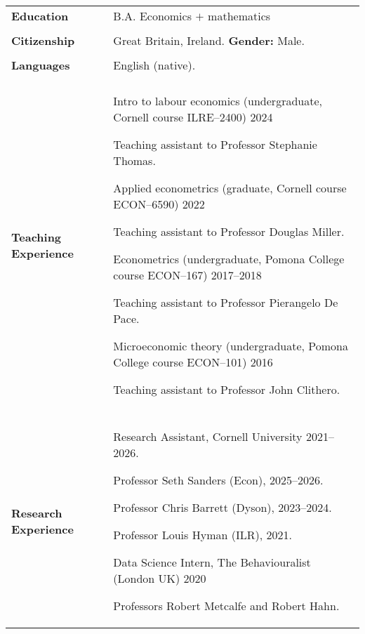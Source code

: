 \documentclass[letterpaper,11pt,oneside]{article}
\begin{document}
\begin{longtable}[\textwidth]{p{} p{}}
\textbf{Education}
    & B.A. Economics $+$ mathematics  \\ \\

\textbf{Citizenship}
    & Great Britain, Ireland. \hfill \textbf{Gender:} Male. \\ \\

\textbf{Languages}
    & English (native). \\ \\
        
\textbf{Teaching Experience}
    & Intro to labour economics (undergraduate, Cornell course ILRE--2400) \hfill 2024

    \indent\hspace{1cm} Teaching assistant to Professor Stephanie Thomas.

    Applied econometrics (graduate, Cornell course ECON--6590) \hfill 2022 
    
    \indent\hspace{1cm} Teaching assistant to Professor Douglas Miller.
    
    Econometrics (undergraduate, Pomona College course ECON--167) \hfill 2017--2018
    
    \indent\hspace{1cm} Teaching assistant to Professor Pierangelo De Pace.

    Microeconomic theory (undergraduate, Pomona College course ECON--101) \hfill 2016

    \indent\hspace{1cm} Teaching assistant to Professor John Clithero. \\ \\

\textbf{Research Experience}
    & Research Assistant, Cornell University \hfill 2021--2026.

    \indent\hspace{1cm} Professor Seth Sanders (Econ), 2025--2026.

    \indent\hspace{1cm} Professor Chris Barrett (Dyson), 2023--2024.

    \indent\hspace{1cm} Professor Louis Hyman (ILR), 2021.

    Data Science Intern, The Behaviouralist (London UK) \hfill 2020

    \indent\hspace{1cm} Professors Robert Metcalfe and Robert Hahn.


\end{longtable}
\end{document}

